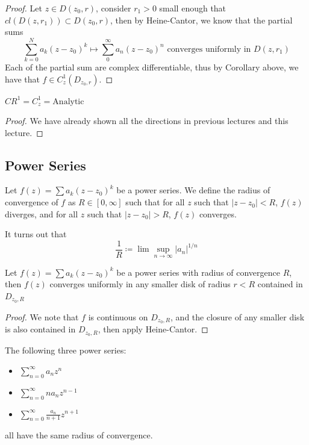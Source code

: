 \begin{proof}
    Let $z \in D(z_0, r)$, consider $r_1 > 0$ small enough that $cl(D(z, r_1)) \subset D(z_0, r)$, then by Heine-Cantor, we know that the partial sums
    \[\sum_{k = 0}^N a_k (z - z_0)^k \mapsto \sum_{0}^\infty a_n (z - z_0)^n \text{ converges uniformly in $D(z, r_1)$}\]
    Each of the partial sum are complex differentiable, thus by Corollary above, we have that $f \in C_z^1(D_{z_0, r})$.
\end{proof}

\begin{theorem}
    $CR^1 = C_z^1 = \text{Analytic}$
\end{theorem}

\begin{proof}
We have already shown all the directions in previous lectures and this lecture.
\end{proof}

\subsection{Power Series}

\begin{definition}
    Let $f(z) = \sum a_k (z - z_0)^k$ be a power series. We define the radius of convergence of $f$ as $R \in [0, \infty]$ such that for all $z$ such that $|z - z_0| < R$, $f(z)$ diverges, and for all $z$ such that $|z - z_0| > R$, $f(z)$ converges.
\end{definition}

\begin{remark}
    It turns out that
    \[\frac{1}{R} \coloneqq \lim \sup_{n \to \infty} |a_n|^{1/n}\]
\end{remark}

\begin{proposition}
    Let $f(z) = \sum a_k (z - z_0)^k$ be a power series with radius of convergence $R$, then $f(z)$ converges uniformly in any smaller disk of radius $r < R$ contained in $D_{z_0, R}$
\end{proposition}

\begin{proof}
    We note that $f$ is continuous on $D_{z_0, R}$, and the closure of any smaller disk is also contained in $D_{z_0, R}$, then apply Heine-Cantor.
\end{proof}

\begin{corollary}
    The following three power series:
    \begin{itemize}
        \item $\sum_{n = 0}^\infty a_n z^n$
        \item $\sum_{n = 0}^\infty n a_n z^{n-1}$
        \item $\sum_{n = 0}^\infty \frac{a_n}{n + 1} z^{n+1}$
    \end{itemize}
    all have the same radius of convergence.
\end{corollary}

